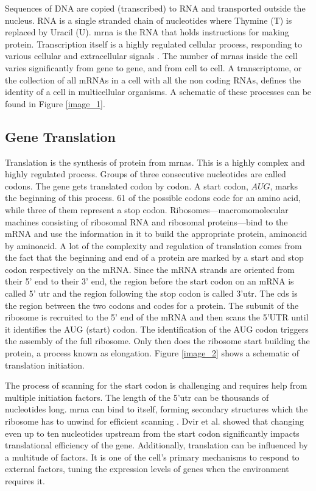 \documentclass[12pt]{article}
\begin{document}
Sequences of DNA are copied (transcribed) to RNA and transported outside the nucleus. RNA is a single stranded chain of nucleotides where Thymine (T) is replaced by Uracil (U). \gls{mrna} is the RNA that holds instructions for making protein. Transcription itself is a highly regulated cellular process, responding to various cellular and extracellular signals \cite{Hahn2011}. The number of \acrshort{mrna}s inside the cell varies significantly from gene to gene, and from cell to cell. A transcriptome, or the collection of all mRNAs in a cell with all the non coding RNAs, defines the identity of a cell in multicellular organisms. A schematic of these processes can be found in Figure \ref{image_1}.



\subsection{Gene Translation}
Translation is the synthesis of protein from \acrshort{mrna}s. This is a highly complex and highly regulated process. Groups of three consecutive nucleotides are called codons. The gene gets translated codon by codon. A start codon, $AUG$, marks the beginning of this process. 61 of the possible codons code for an amino acid, while three of them represent a stop codon. Ribosomes---macromomolecular machines consisting of ribosomal RNA and ribosomal proteins---bind to the mRNA and use the information in it to build the appropriate protein, aminoacid by aminoacid. A lot of the complexity and regulation of translation comes from the fact that the beginning and end of a protein are marked by a start and stop codon respectively on the mRNA. Since the mRNA strands are oriented from their 5' end to their 3' end, the region before the start codon on an mRNA is called 5' \gls{utr} and the region following the stop codon is called 3'\acrshort{utr}. The \gls{cds} is the region  between the two codons and codes for a protein. The subunit of the ribosome is recruited to the 5' end of the mRNA and then scans the 5'UTR until it identifies the AUG (start) codon.  The identification of the AUG codon triggers the assembly of the full ribosome. Only then does the ribosome start building the protein, a process known as elongation. Figure \ref{image_2} shows a schematic of translation initiation. 
 


The process of scanning for the start codon is challenging and requires help from multiple initiation factors. The length of the 5'\acrshort{utr} can be thousands of nucleotides long. \acrshort{mrna} can bind to itself, forming secondary structures which the ribosome has to unwind for efficient scanning \cite{Kertesz2010}. Dvir et al. \cite{Dvir2013} showed that changing even up to ten nucleotides upstream from the start codon significantly impacts translational efficiency of the gene. Additionally, translation can be influenced by a multitude of factors. It is one of the cell's primary mechanisms to respond to external factors, tuning the expression levels of genes when the environment requires it. 
\end{document}
